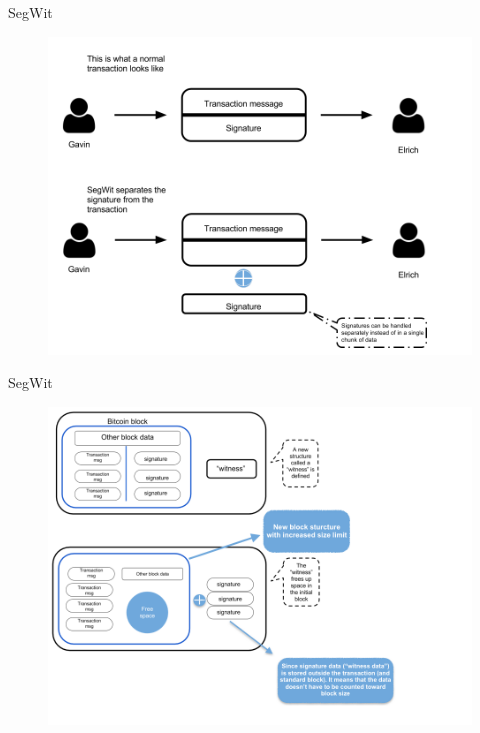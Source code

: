 \documentclass[10pt]{beamer}
\begin{document}
\begin{frame}{SegWit}
	\begin{figure}[]
		\centering
		\includegraphics  [scale=0.3]{Images/segwit1}
	\end{figure}
\end{frame}


\begin{frame}{SegWit}
	\begin{figure}[]
		\centering
		\includegraphics  [scale=0.3]{Images/segwit2}
	\end{figure}
\end{frame}
\end{document}
